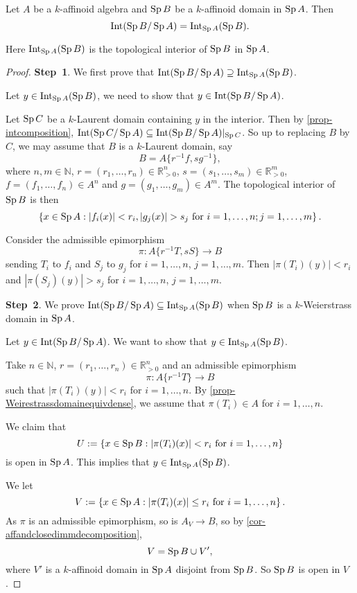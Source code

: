 \begin{proposition}\label{prop-affinoiddomaininterior}
    Let $A$ be a $k$-affinoid algebra and $\operatorname{Sp} B$ be a $k$-affinoid domain in $\operatorname{Sp} A$. Then
    \[
        \operatorname{Int}(\operatorname{Sp} B/\operatorname{Sp} A)=\operatorname{Int}_{\operatorname{Sp} A}(\operatorname{Sp} B).  
    \]
\end{proposition}
Here $\operatorname{Int}_{\operatorname{Sp} A}(\operatorname{Sp} B)$ is the topological interior of $\operatorname{Sp} B$ in $\operatorname{Sp} A$.
\begin{proof}
    \textbf{Step~1}. We first prove that $\operatorname{Int}(\operatorname{Sp} B/\operatorname{Sp} A)\supseteq \operatorname{Int}_{\operatorname{Sp} A}(\operatorname{Sp} B)$. 

    Let $y\in \operatorname{Int}_{\operatorname{Sp} A}(\operatorname{Sp} B)$, we need to show that $y\in \operatorname{Int}(\operatorname{Sp} B/\operatorname{Sp} A)$. 
    
    Let $\operatorname{Sp} C$ be a $k$-Laurent domain containing $y$ in the interior. Then by  \cref{prop-intcomposition}, $\operatorname{Int}(\operatorname{Sp} C/\operatorname{Sp} A)\subseteq \operatorname{Int}(\operatorname{Sp} B/\operatorname{Sp} A)|_{\operatorname{Sp} C}$. So up to replacing $B$ by $C$, we may assume that $B$ is a $k$-Laurent domain, say
    \[
        B=A\{r^{-1}f,sg^{-1}\},  
    \]
    where $n,m\in \mathbb{N}$, $r=(r_1,\ldots,r_n)\in \mathbb{R}_{>0}^n$, $s=(s_1,\ldots,s_m)\in \mathbb{R}_{>0}^m$, $f=(f_1,\ldots,f_n)\in A^n$ and $g=(g_1,\ldots,g_m)\in A^m$. The topological interior of $\operatorname{Sp} B$ is then
    \[
        \left\{x\in \Sp A: |f_i(x)|<r_i, |g_j(x)|>s_j\text{ for }i=1,\ldots,n; j=1,\ldots,m\right\}.
    \]

    Consider the admissible epimorphism
    \[
        \pi:A\{r^{-1}T,sS\}\rightarrow B  
    \]
    sending $T_i$ to $f_i$ and $S_j$ to $g_j$ for $i=1,\ldots,n$, $j=1,\ldots,m$. Then $|\pi(T_i)(y)|<r_i$ and $|\pi(S_j)(y)|>s_j$ for $i=1,\ldots,n$, $j=1,\ldots,m$.

    \textbf{Step~2}. We prove $\operatorname{Int}(\operatorname{Sp} B/\operatorname{Sp} A)\subseteq \operatorname{Int}_{\operatorname{Sp} A}(\operatorname{Sp} B)$ when $\operatorname{Sp} B$ is a $k$-Weierstrass domain in $\operatorname{Sp} A$.

    Let $y\in \operatorname{Int}(\operatorname{Sp} B/\operatorname{Sp} A)$. We want to show that $y\in \operatorname{Int}_{\operatorname{Sp} A}(\operatorname{Sp} B)$.

    Take $n\in \mathbb{N}$, $r=(r_1,\ldots,r_n)\in \mathbb{R}^n_{>0}$ and an admissible epimorphism
    \[
        \pi:A\{r^{-1}T\} \rightarrow B 
    \]
    such that $|\pi(T_i)(y)|<r_i$ for $i=1,\ldots,n$. 
    By \cref{prop-Weirestrassdomainequivdense}, we assume that $\pi(T_i)\in A$ for $i=1,\ldots,n$.
    
    We claim that 
    \[
        U:=\left\{x\in \operatorname{Sp} B: |\pi(T_i)(x)|<r_i\text{ for }i=1,\ldots,n\right\}  
    \]
    is open in $\operatorname{Sp} A$. This implies that $y\in \operatorname{Int}_{\operatorname{Sp} A}(\operatorname{Sp} B)$.
    
    
    We let 
    \[
        V:=\left\{x\in \operatorname{Sp} A: |\pi(T_i)(x)|\leq r_i\text{ for }i=1,\ldots,n\right\}.  
    \]
    As $\pi$ is an admissible epimorphism, so is $A_V\rightarrow B$, so by \cref{cor-affandclosedimmdecomposition},
    \[
        V=\operatorname{Sp} B\cup V',
    \]
    where $V'$ is a $k$-affinoid domain in $\operatorname{Sp} A$ disjoint from $\operatorname{Sp} B$. So $\operatorname{Sp} B$ is open in $V$.
    

\end{proof}
